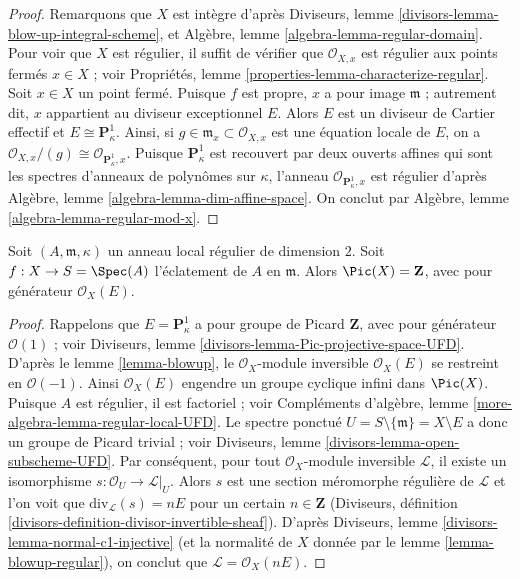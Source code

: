 \begin{proof} Remarquons que $X$ est intègre d'après Diviseurs, lemme \ref{divisors-lemma-blow-up-integral-scheme}, et Algèbre, lemme \ref{algebra-lemma-regular-domain}. Pour voir que $X$ est régulier, il suffit de vérifier que $\mathcal{O}_{X, x}$ est régulier aux points fermés $x \in X$ ; voir Propriétés, lemme \ref{properties-lemma-characterize-regular}. Soit $x \in X$ un point fermé. Puisque $f$ est propre, $x$ a pour image $\mathfrak m$ ; autrement dit, $x$ appartient au diviseur exceptionnel $E$. Alors $E$ est un diviseur de Cartier effectif et $E \cong \mathbf{P}^1_\kappa$. Ainsi, si $g \in \mathfrak m_x \subset \mathcal{O}_{X, x}$ est une équation locale de $E$, on a $\mathcal{O}_{X, x}/(g) \cong \mathcal{O}_{\mathbf{P}^1_\kappa, x}$. Puisque $\mathbf{P}^1_\kappa$ est recouvert par deux ouverts affines qui sont les spectres d'anneaux de polynômes sur $\kappa$, l'anneau $\mathcal{O}_{\mathbf{P}^1_\kappa, x}$ est régulier d'après Algèbre, lemme \ref{algebra-lemma-dim-affine-space}. On conclut par Algèbre, lemme \ref{algebra-lemma-regular-mod-x}. \end{proof}

\begin{lemma} \label{lemma-blowup-pic} Soit $(A, \mathfrak m, \kappa)$ un anneau local régulier de dimension $2$. Soit $f : X \to S = \Spec(A)$ l'éclatement de $A$ en $\mathfrak m$. Alors $\Pic(X) = \mathbf{Z}$, avec pour générateur $\mathcal{O}_X(E)$. \end{lemma}

\begin{proof} Rappelons que $E = \mathbf{P}^1_\kappa$ a pour groupe de Picard $\mathbf{Z}$, avec pour générateur $\mathcal{O}(1)$ ; voir Diviseurs, lemme \ref{divisors-lemma-Pic-projective-space-UFD}. D'après le lemme \ref{lemma-blowup}, le $\mathcal{O}_X$-module inversible $\mathcal{O}_X(E)$ se restreint en $\mathcal{O}(-1)$. Ainsi $\mathcal{O}_X(E)$ engendre un groupe cyclique infini dans $\Pic(X)$. Puisque $A$ est régulier, il est factoriel ; voir Compléments d'algèbre, lemme \ref{more-algebra-lemma-regular-local-UFD}. Le spectre ponctué $U = S \setminus \{\mathfrak m\} = X \setminus E$ a donc un groupe de Picard trivial ; voir Diviseurs, lemme \ref{divisors-lemma-open-subscheme-UFD}. Par conséquent, pour tout $\mathcal{O}_X$-module inversible $\mathcal{L}$, il existe un isomorphisme $s : \mathcal{O}_U \to \mathcal{L}|_U$. Alors $s$ est une section méromorphe régulière de $\mathcal{L}$ et l'on voit que $\text{div}_\mathcal{L}(s) = nE$ pour un certain $n \in \mathbf{Z}$ (Diviseurs, définition \ref{divisors-definition-divisor-invertible-sheaf}). D'après Diviseurs, lemme \ref{divisors-lemma-normal-c1-injective} (et la normalité de $X$ donnée par le lemme \ref{lemma-blowup-regular}), on conclut que $\mathcal{L} = \mathcal{O}_X(nE)$. \end{proof}

